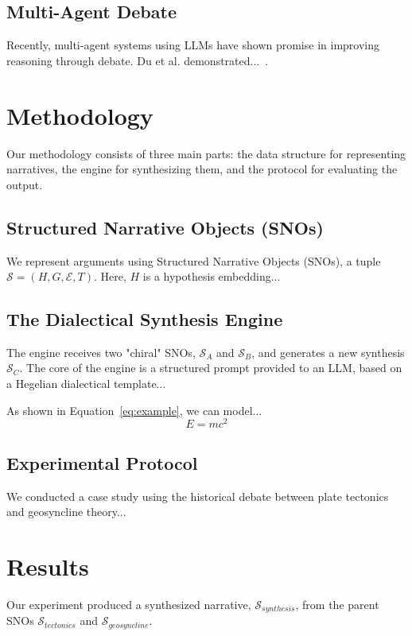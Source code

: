 \documentclass[twocolumn, 10pt]{article}
\begin{document}
\subsection{Multi-Agent Debate}
Recently, multi-agent systems using LLMs have shown promise in improving reasoning through debate. Du et al. demonstrated...~\cite{du2023improving}.

\section{Methodology}
\label{sec:method}

Our methodology consists of three main parts: the data structure for representing narratives, the engine for synthesizing them, and the protocol for evaluating the output.

\subsection{Structured Narrative Objects (SNOs)}
We represent arguments using Structured Narrative Objects (SNOs), a tuple $\mathcal{S} = (H, G, \mathcal{E}, T)$. Here, $H$ is a hypothesis embedding...

\subsection{The Dialectical Synthesis Engine}
The engine receives two "chiral" SNOs, $\mathcal{S}_A$ and $\mathcal{S}_B$, and generates a new synthesis $\mathcal{S}_C$. The core of the engine is a structured prompt provided to an LLM, based on a Hegelian dialectical template...

As shown in Equation~\ref{eq:example}, we can model...
\begin{equation}
    E = mc^2
    \label{eq:example}
\end{equation}

\subsection{Experimental Protocol}
We conducted a case study using the historical debate between plate tectonics and geosyncline theory...

\section{Results}
\label{sec:results}

Our experiment produced a synthesized narrative, $\mathcal{S}_{synthesis}$, from the parent SNOs $\mathcal{S}_{tectonics}$ and $\mathcal{S}_{geosyncline}$.
\end{document}
